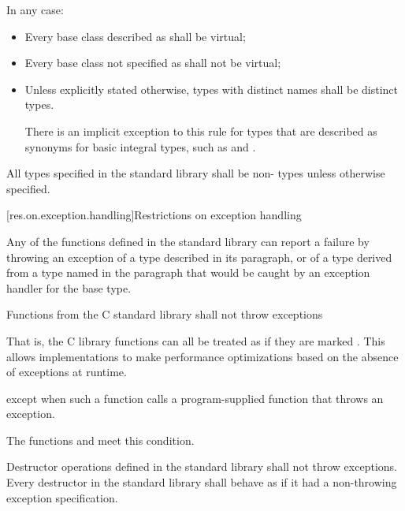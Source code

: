 \pnum
In any case:
\begin{itemize}
\item
Every base class described as
shall be virtual;
%
\item
Every base class not specified as
 shall not be virtual;
\item
Unless explicitly stated otherwise, types with distinct names shall be distinct
types.
\begin{footnote}
There is an implicit exception to this rule for types that are
described as synonyms for basic integral types, such as
 and
.
\end{footnote}
\end{itemize}

\pnum
All types specified in the \Cpp{} standard library shall be non- types
unless otherwise specified.

[res.on.exception.handling]{Restrictions on exception handling}%
%

\pnum
Any of the functions defined in the \Cpp{} standard library
%
can report a failure by throwing an exception of a type
described in its \throws paragraph,
or of a type derived from a type named in the \throws paragraph
that would be caught by an exception handler for the base type.

\pnum
Functions from the C standard library shall not throw exceptions%
%
\begin{footnote}
That is, the C
library functions can all be treated as if they
are marked .
This allows implementations to make performance optimizations
based on the absence of exceptions at runtime.
\end{footnote}
except when such a function calls a program-supplied function that throws an
exception.
\begin{footnote}
The functions
and
 meet this condition.
\end{footnote}

\pnum
Destructor operations defined in the \Cpp{} standard library
shall not throw exceptions.
Every destructor in the \Cpp{} standard library shall behave as if it had a
non-throwing exception specification.

